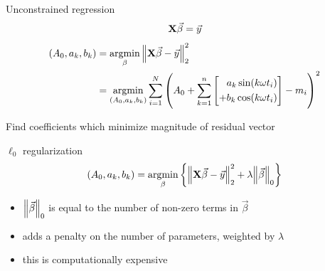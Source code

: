 \documentclass{beamer}
\DeclareMathOperator*{\argmin}{argmin}
\begin{document}
\begin{frame}{Unconstrained regression}
  \begin{displaymath}
    \vb{X} \vec\beta = \vec{y}
  \end{displaymath}
  \begin{align*}
    (A_0, a_k, b_k) &=
    \argmin_\beta \norm{\vb{X} \vec\beta - \vec{y}}_2^2
    \\ &=
    \argmin_{(A_0, a_k, b_k)}
    \sum_{i=1}^N \qty(
      A_0 +
      \sum_{k=1}^n \qty[
        \begin{aligned}
           & a_k \sin(k \omega t_i)
          \\
          +& b_k \cos(k \omega t_i)
        \end{aligned}
      ] - m_i
    )^2
  \end{align*}
  \begin{center}
    Find coefficients which minimize magnitude of residual vector
  \end{center}
\end{frame}


\begin{frame}{$\ell_0$ regularization}
  \begin{displaymath}
    (A_0, a_k, b_k) =
    \argmin_\beta \qty{
      \norm{\vb{X} \vec\beta - \vec{y}}_2^2 +
      \lambda \norm{\vec\beta}_0
    }
  \end{displaymath}
  \begin{itemize}
  \item $\norm{\vec\beta}_0$ is equal to the number of non-zero terms in $\vec\beta$
  \item adds a penalty on the number of parameters, weighted by $\lambda$
  \item this is computationally expensive
  \end{itemize}
\end{frame}
\end{document}
